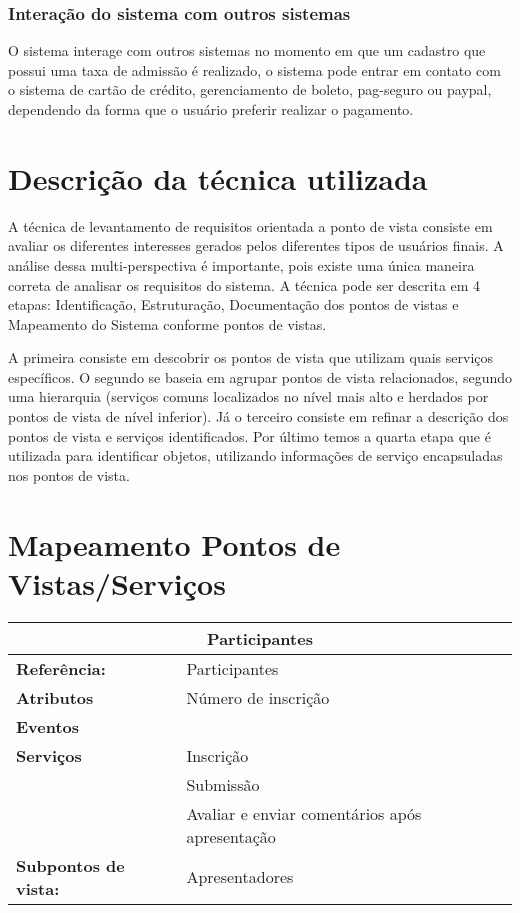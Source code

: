 \documentclass[letter]{article}
\begin{document}
\subsubsection{Interação do sistema com outros sistemas}

O sistema interage com outros sistemas no momento em que um cadastro que possui uma taxa de admissão é realizado, o sistema pode entrar em contato com o sistema de cartão de crédito, gerenciamento de boleto, pag-seguro ou paypal, dependendo da forma que o usuário preferir realizar o pagamento.



\section{Descrição da técnica utilizada}

A técnica de levantamento de requisitos orientada a ponto de vista consiste em avaliar os diferentes interesses gerados pelos diferentes tipos de usuários finais. A análise dessa multi-perspectiva é importante, pois existe uma única maneira correta de analisar os requisitos do sistema. A técnica pode ser descrita em 4 etapas: Identificação, Estruturação, Documentação dos pontos de vistas e Mapeamento do Sistema conforme pontos de vistas.

A primeira consiste em descobrir os pontos de vista que utilizam quais serviços específicos. O segundo se baseia em agrupar pontos de vista relacionados, segundo uma hierarquia (serviços comuns localizados no nível mais alto e herdados por pontos de vista de nível inferior). Já o terceiro consiste em refinar a descrição dos pontos de vista e serviços identificados. Por último temos a quarta etapa que é utilizada para identificar objetos, utilizando informações de serviço encapsuladas nos pontos de vista.





\section{Mapeamento Pontos de Vistas/Serviços}

\begin{table}
\begin{tabular}{|ll|}
\hline 
\multicolumn{2}{|c|}{\textbf{Participantes}}\tabularnewline
\hline
\textbf{Referência:} & Participantes\tabularnewline
\textbf{Atributos} & Número de inscrição\tabularnewline
\textbf{Eventos} & \tabularnewline
\textbf{Serviços} & Inscrição\tabularnewline
 & Submissão\tabularnewline
 & Avaliar e enviar comentários após apresentação\tabularnewline
\textbf{Subpontos de vista:} & Apresentadores \tabularnewline
\hline
\end{tabular}
\end{table}
\end{document}
